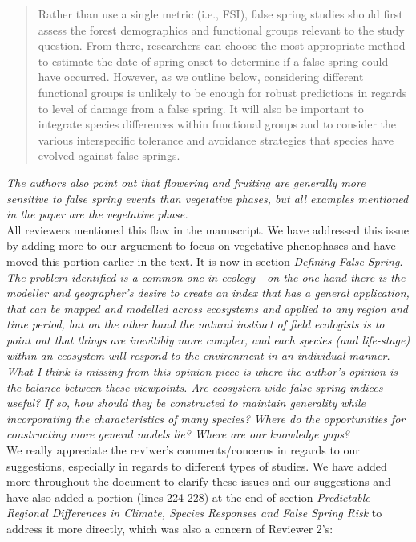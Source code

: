 \documentclass[11pt,a4paper]{article}
\begin{document}
\begin{quote}
Rather than use a single metric (i.e., FSI), false spring studies should first assess the forest demographics and functional groups relevant to the study question. From there, researchers can choose the most appropriate method to estimate the date of spring onset to determine if a false spring could have occurred. However, as we outline below, considering different functional groups is unlikely to be enough for robust predictions in regards to level of damage from a false spring. It will also be important to integrate species differences within functional groups and to consider the various interspecific tolerance and avoidance strategies that species have evolved against false springs.
\end{quote} 

\textit{The authors also point out that flowering and fruiting are generally more sensitive to false spring events than vegetative phases, but all examples mentioned in the paper are the vegetative phase.} \\

All reviewers mentioned this flaw in the manuscript. We have addressed this issue by adding more to our arguement to focus on vegetative phenophases and have moved this portion earlier in the text. It is now in section \textit{Defining False Spring}. \\

\textit{The problem identified is a common one in ecology - on the one hand there is the modeller and geographer's desire to create an index that has a general application, that can be mapped and modelled across ecosystems and applied to any region and time period, but on the other hand the natural instinct of field ecologists is to point out that things are inevitibly more complex, and each species (and life-stage) within an ecosystem will respond to the environment in an individual manner. What I think is missing from this opinion piece is where the author's opinion is the balance between these viewpoints.  Are ecosystem-wide false spring indices useful?  If so, how should they be constructed to maintain generality while incorporating the characteristics of many species?  Where do the opportunities for constructing more general models lie? Where are our knowledge gaps?} \\

We really appreciate the reviwer's comments/concerns in regards to our suggestions, especially in regards to different types of studies. We have added more throughout the document to clarify these issues and our suggestions and have also added a portion (lines 224-228) at the end of section \textit{Predictable Regional Differences in Climate, Species Responses and False Spring Risk} to address it more directly, which was also a concern of Reviewer 2's: \\
\end{document}
